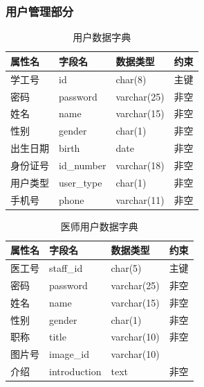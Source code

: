 \documentclass{article}
\begin{document}
\subsubsection{用户管理部分}

\begin{table}[H]
    \centering
    \begin{tabularx}{\textwidth}{|p{2.2cm}|p{3.2cm}|p{4.8cm}|p{5cm}|}
    \toprule
    \textbf{属性名} & \textbf{字段名} & \textbf{数据类型} & \textbf{约束}\\ \midrule
    学工号 & id & char(8) & 主键 \\ \midrule
    密码 & password & varchar(25) & 非空 \\ \midrule
    姓名 & name & varchar(15) & 非空 \\ \midrule
    性别 & gender & char(1) & 非空 \\ \midrule
    出生日期 & birth & date & 非空 \\ \midrule
    身份证号 & id\_number & varchar(18) & 非空 \\ \midrule
    用户类型 & user\_type & char(1) & 非空 \\ \midrule
    手机号 & phone & varchar(11) & 非空 \\ \bottomrule
    \end{tabularx}
    \caption{用户数据字典}
    \label{tab:student_user}
\end{table}

\begin{table}[H]
    \centering
    \begin{tabularx}{\textwidth}{|p{2.2cm}|p{3.2cm}|p{4.8cm}|p{5cm}|}
    \toprule
    \textbf{属性名} & \textbf{字段名} & \textbf{数据类型} & \textbf{约束} \\ \midrule
    医工号 & staff\_id & char(5) & 主键 \\ \midrule
    密码 & password & varchar(25) & 非空 \\ \midrule
    姓名 & name & varchar(15) & 非空 \\ \midrule
    性别 & gender & char(1) & 非空 \\ \midrule
    职称 & title & varchar(10) & 非空 \\ \midrule
    图片号 & image\_id & varchar(10) &  \\ \midrule
    介绍 & introduction & text & 非空 \\ \bottomrule
    \end{tabularx}
    \caption{医师用户数据字典}
    \label{tab:doctor_user}
\end{table}
\end{document}
